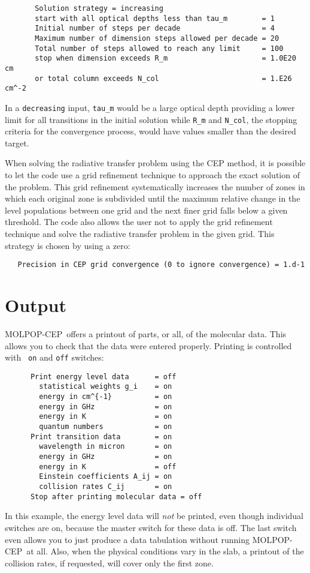 \documentclass[12pt]{article}
\def\separation {0.5cm}
\def\M{MOLPOP-CEP}
\begin{document}
\vspace{\separation}
\begin{verbatim}
       Solution strategy = increasing
       start with all optical depths less than tau_m        = 1
       Initial number of steps per decade                   = 4
       Maximum number of dimension steps allowed per decade = 20
       Total number of steps allowed to reach any limit     = 100
       stop when dimension exceeds R_m                      = 1.0E20 cm
       or total column exceeds N_col                        = 1.E26 cm^-2
\end{verbatim}
In a {\tt decreasing} input, {\tt tau\_m} would be a large optical depth
providing a lower limit for all transitions in the initial solution while
{\tt R\_m} and {\tt N\_col}, the stopping criteria for the convergence process,
would have values smaller than the desired target.

When solving the radiative transfer problem using the CEP method, it is
possible to let the code use a grid refinement technique to approach the exact
solution of the problem. This grid refinement systematically increases the
number of zones in which each original zone is subdivided until the maximum
relative change in the level populations between one grid and the next finer
grid falls below a given threshold. The code also allows the user not to apply
the grid refinement technique and solve the radiative transfer problem in the
given grid. This strategy is chosen by using a zero:

\vspace{\separation}
\begin{verbatim}
   Precision in CEP grid convergence (0 to ignore convergence) = 1.d-1
\end{verbatim}




\section{Output}
\label{sec:output}
\M\ offers a printout of parts, or all, of the molecular data. This allows you
to check that the data were entered properly. Printing is controlled with {\tt
on} and {\tt off} switches:
\begin{verbatim}
      Print energy level data      = off
        statistical weights g_i    = on
        energy in cm^{-1}          = on
        energy in GHz              = on
        energy in K                = on
        quantum numbers            = on
      Print transition data        = on
        wavelength in micron       = on
        energy in GHz              = on
        energy in K                = off
        Einstein coefficients A_ij = on
        collision rates C_ij       = on
      Stop after printing molecular data = off
\end{verbatim}
In this example, the energy level data will {\em not} be printed, even though
individual switches are on, because the master switch for these data is off.
The last switch even allows you to just produce a data tabulation without
running \M\ at all. Also, when the physical conditions vary in the slab, a
printout of the collision rates, if requested, will cover only the first zone.
\end{document}
